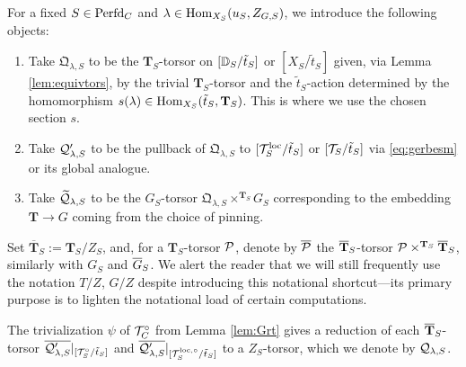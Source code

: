 \begin{defi}\label{defi:Qdefs}
For a fixed $S \in \mathrm{Perfd}_{C}$ and $\lambda \in \mathrm{Hom}_{X_{S}}(u_{S}, Z_{G,S})$, we introduce the following objects:
\begin{enumerate}
    \item{Take $\mathfrak{Q}_{\lambda,S}$ to be the $\mathbf{T}_{S}$-torsor on $[\mathbb D_{S}/\tilde{t}_{S}]$ or $[X_{S}/\tilde{t}_{S}]$ given, via Lemma \ref{lem:equivtors}, by the trivial $\mathbf{T}_{S}$-torsor and the $\tilde{t}_{S}$-action determined by the homomorphism $s(\lambda) \in \mathrm{Hom}_{X_{S}}(\tilde{t}_{S},\mathbf{T}_{S})$. This is where we use the chosen section $s$.}
    \item{Take $\mathcal{Q}_{\lambda,S}'$ to be the pullback of $\mathfrak{Q}_{\lambda,S}$ to $[\mathcal{T}_{S}^{\mathrm{loc}}/\tilde{t}_{S}]$ or $[\mathcal{T}_{S}/\tilde{t}_{S}]$ via \eqref{eq:gerbesm} or its global analogue.}
    \item{Take $\widetilde{\mathcal{Q}}_{\lambda,S}$ to be the $G_{S}$-torsor $\mathfrak{Q}_{\lambda,S} \times^{\mathbf{T}_{S}} G_{S}$ corresponding to the embedding $\mathbf{T} \to G$ coming from the choice of pinning.}
\end{enumerate}
\end{defi}

Set $\overline{\mathbf{T}}_{S}:= \mathbf{T}_{S}/Z_{S}$, and, for a $\mathbf{T}_{S}$-torsor $\mathcal{P}$, denote by $\overline{\mathcal{P}}$ the $\overline{\mathbf{T}}_{S}$-torsor $\mathcal{P} \times^{\mathbf{T}_{S}} \overline{\mathbf{T}}_{S}$, similarly with $G_{S}$ and $\overline{G}_{S}$. We alert the reader that we will still frequently use the notation $T/Z$, $G/Z$ despite introducing this notational shortcut---its primary purpose is to lighten the notational load of certain computations.

\begin{lem}\label{lem:Zred}
The trivialization $\psi$ of $\mathcal{T}_{C}^{\circ}$ from Lemma \ref{lem:Grt} gives a reduction of each $\overline{\mathbf{T}}_{S}$-torsor $\overline{\mathcal{Q}_{\lambda,S}'}|_{[\mathcal{T}_{S}^{\circ}/\tilde{t}_{S}]}$ and $\overline{\mathcal{Q}_{\lambda,S}'}|_{[\mathcal{T}_{S}^{\mathrm{loc},\circ}/\tilde{t}_{S}]}$ to a $Z_{S}$-torsor, which we denote by $\mathcal{Q}_{\lambda,S}$.
\end{lem}

